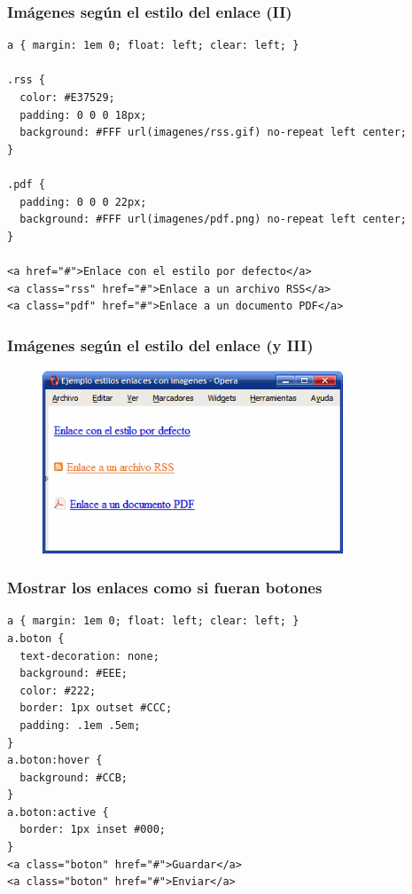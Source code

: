 \documentclass[ucs]{beamer}
\begin{document}
\begin{frame}[fragile]
\frametitle{Imágenes según el estilo del enlace (II)}

\begin{footnotesize}
\begin{verbatim}
a { margin: 1em 0; float: left; clear: left; }
 
.rss {
  color: #E37529;
  padding: 0 0 0 18px;
  background: #FFF url(imagenes/rss.gif) no-repeat left center;
}
 
.pdf {
  padding: 0 0 0 22px;
  background: #FFF url(imagenes/pdf.png) no-repeat left center;
}
 
<a href="#">Enlace con el estilo por defecto</a>
<a class="rss" href="#">Enlace a un archivo RSS</a>
<a class="pdf" href="#">Enlace a un documento PDF</a>
\end{verbatim}
\end{footnotesize}

\end{frame}


\begin{frame}
\frametitle{Imágenes según el estilo del enlace (y III)}


\begin{center}
\begin{figure}[p]
\includegraphics[width=0.8\textwidth]{figs/f0704.png}
\end{figure}
\end{center}

\end{frame}



\begin{frame}[fragile]
\frametitle{Mostrar los enlaces como si fueran botones}

\begin{footnotesize}
\begin{verbatim}
a { margin: 1em 0; float: left; clear: left; }
a.boton {
  text-decoration: none;
  background: #EEE;
  color: #222;
  border: 1px outset #CCC;
  padding: .1em .5em;
}
a.boton:hover {
  background: #CCB;
}
a.boton:active {
  border: 1px inset #000;
}
<a class="boton" href="#">Guardar</a>
<a class="boton" href="#">Enviar</a>
\end{verbatim}
\end{footnotesize}

\end{frame}
\end{document}
